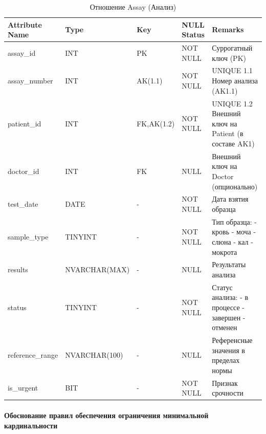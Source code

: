 \documentclass[a4paper, 14pt]{extarticle}
\begin{document}
\begin{table}[h!]
\captionsetup{singlelinecheck=false, position=top}
\caption{Отношение Assay (Анализ)}
\begin{tabularx}{\textwidth}{|l|l|l|l|Y|}
\hline
  \textbf{Attribute Name} & \textbf{Type} & \textbf{Key} & \textbf{NULL Status} & \textbf{Remarks}\\
\hline
assay\_id & INT & PK & NOT NULL & Суррогатный ключ (PK)\\
\hline
assay\_number & INT & AK(1.1) & NOT NULL & UNIQUE 1.1 Номер анализа (AK1.1)\\
\hline
patient\_id & INT & FK,AK(1.2) & NOT NULL & UNIQUE 1.2 Внешний ключ на Patient (в составе AK1)\\
\hline
doctor\_id & INT & FK & NULL & Внешний ключ на Doctor (опционально)\\
\hline
test\_date & DATE & - & NOT NULL & Дата взятия образца\\
\hline
sample\_type & TINYINT & - & NOT NULL & Тип образца:  - кровь  - моча  - слюна  - кал  - мокрота
\\
\hline
results & NVARCHAR(MAX) & - & NULL & Результаты анализа\\
\hline
status & TINYINT & - & NOT NULL & Статус анализа:  - в процессе  - завершен  - отменен
\\
\hline
reference\_range & NVARCHAR(100) & - & NULL & Референсные значения в пределах нормы\\
\hline
is\_urgent & BIT & - & NOT NULL & Признак срочности\\
\hline
\end{tabularx}
\end{table}

\clearpage


\paragraph{Обоснование правил обеспечения ограничения минимальной кардинальности}
\end{document}
